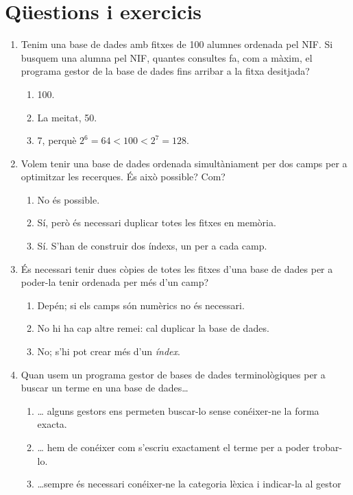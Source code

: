 \section{Qüestions i exercicis}
\begin{enumerate}

\item Tenim una base de dades amb fitxes de 100 alumnes ordenada pel
  NIF.  Si busquem una alumna pel NIF, quantes consultes fa, com a
  màxim, el programa gestor de la base de dades fins arribar a la
  fitxa desitjada?
  \begin{enumerate}
  \item 100.
  \item La meitat, 50.
  \item 7, perquè \(2^6=64 < 100 < 2^7=128\).
  \end{enumerate}

\item Volem tenir una base de dades ordenada simultàniament per dos
  camps per a optimitzar les recerques. És això possible? Com?
  \begin{enumerate}
  \item No és possible.
  \item Sí, però és necessari duplicar totes les fitxes en memòria.
  \item Sí. S'han de construir dos índexs, un per a cada camp.
  \end{enumerate}

\item És necessari tenir dues còpies de totes les fitxes d'una base de
  dades per a poder-la tenir ordenada per més d'un camp?
  \begin{enumerate}
  \item Depén; si els camps són numèrics no és necessari.
  \item No hi ha cap altre remei: cal duplicar la base de dades.
  \item No; s'hi pot crear més d'un \emph{índex}.
  \end{enumerate}

\item Quan usem un programa gestor de bases de dades terminològiques
  per a buscar un terme en una base de dades{\ldots}
  \begin{enumerate}
  \item {\ldots} alguns gestors ens permeten buscar-lo sense
    conéixer-ne la forma exacta.
  \item {\ldots} hem de conéixer com s'escriu exactament el terme per
    a poder trobar-lo.
  \item {\ldots}sempre és necessari conéixer-ne la categoria lèxica i
    indicar-la al gestor
  \end{enumerate}


\end{enumerate}
